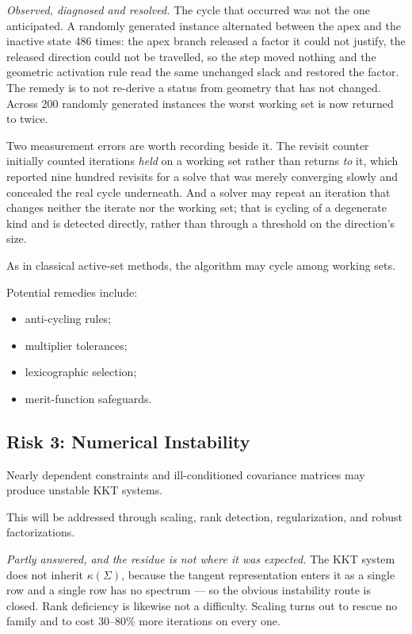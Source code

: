 \documentclass[11pt,a4paper]{article}
\begin{document}
\emph{Observed, diagnosed and resolved.} The cycle that occurred was
not the one anticipated. A randomly generated instance alternated
between the apex and the inactive state 486 times: the apex branch
released a factor it could not justify, the released direction could
not be travelled, so the step moved nothing and the geometric
activation rule read the same unchanged slack and restored the factor.
The remedy is to not re-derive a status from geometry that has not
changed. Across 200 randomly generated instances the worst working set
is now returned to twice.

Two measurement errors are worth recording beside it. The revisit
counter initially counted iterations \emph{held} on a working set
rather than returns \emph{to} it, which reported nine hundred revisits
for a solve that was merely converging slowly and concealed the real
cycle underneath. And a solver may repeat an iteration that changes
neither the iterate nor the working set; that is cycling of a
degenerate kind and is detected directly, rather than through a
threshold on the direction's size.

As in classical active-set methods, the algorithm may cycle among
working sets.

Potential remedies include:

\begin{itemize}
    \item anti-cycling rules;
    \item multiplier tolerances;
    \item lexicographic selection;
    \item merit-function safeguards.
\end{itemize}

\subsection{Risk 3: Numerical Instability}

Nearly dependent constraints and ill-conditioned covariance matrices
may produce unstable KKT systems.

This will be addressed through scaling, rank detection,
regularization, and robust factorizations.

\emph{Partly answered, and the residue is not where it was expected.}
The KKT system does not inherit $\kappa(\Sigma)$, because the tangent
representation enters it as a single row and a single row has no
spectrum --- so the obvious instability route is closed. Rank
deficiency is likewise not a difficulty. Scaling turns out to rescue
no family and to cost 30--80\% more iterations on every one.
\end{document}
